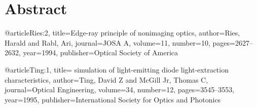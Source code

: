 \chapter*{Abstract}


\medskip

@article{Ries:2,
  title={Edge-ray principle of nonimaging optics},
  author={Ries, Harald and Rabl, Ari},
  journal={JOSA A},
  volume={11},
  number={10},
  pages={2627--2632},
  year={1994},
  publisher={Optical Society of America}
}

@article{Ting:1,
  title={ simulation of light-emitting diode light-extraction characteristics},
  author={Ting, David Z and McGill Jr, Thomas C},
  journal={Optical Engineering},
  volume={34},
  number={12},
  pages={3545--3553},
  year={1995},
  publisher={International Society for Optics and Photonics}
}



\smallskip

